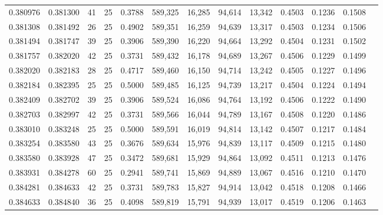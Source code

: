 \begin{tabular}{rrrrrrrrrrrrr}
0.380976 & 0.381300 &    41 &  25 &                                     0.3788 & 589,325 &  16,285 &  94,614 &  13,342 & 0.4503 & 0.1236 & 0.1508 \\
0.381308 & 0.381492 &    26 &  25 &                                     0.4902 & 589,351 &  16,259 &  94,639 &  13,317 & 0.4503 & 0.1234 & 0.1506 \\
0.381494 & 0.381747 &    39 &  25 &                                     0.3906 & 589,390 &  16,220 &  94,664 &  13,292 & 0.4504 & 0.1231 & 0.1502 \\
0.381757 & 0.382020 &    42 &  25 &                                     0.3731 & 589,432 &  16,178 &  94,689 &  13,267 & 0.4506 & 0.1229 & 0.1499 \\
0.382020 & 0.382183 &    28 &  25 &                                     0.4717 & 589,460 &  16,150 &  94,714 &  13,242 & 0.4505 & 0.1227 & 0.1496 \\
0.382184 & 0.382395 &    25 &  25 &                                     0.5000 & 589,485 &  16,125 &  94,739 &  13,217 & 0.4504 & 0.1224 & 0.1494 \\
0.382409 & 0.382702 &    39 &  25 &                                     0.3906 & 589,524 &  16,086 &  94,764 &  13,192 & 0.4506 & 0.1222 & 0.1490 \\
0.382703 & 0.382997 &    42 &  25 &                                     0.3731 & 589,566 &  16,044 &  94,789 &  13,167 & 0.4508 & 0.1220 & 0.1486 \\
0.383010 & 0.383248 &    25 &  25 &                                     0.5000 & 589,591 &  16,019 &  94,814 &  13,142 & 0.4507 & 0.1217 & 0.1484 \\
0.383254 & 0.383580 &    43 &  25 &                                     0.3676 & 589,634 &  15,976 &  94,839 &  13,117 & 0.4509 & 0.1215 & 0.1480 \\
0.383580 & 0.383928 &    47 &  25 &                                     0.3472 & 589,681 &  15,929 &  94,864 &  13,092 & 0.4511 & 0.1213 & 0.1476 \\
0.383931 & 0.384278 &    60 &  25 &                                     0.2941 & 589,741 &  15,869 &  94,889 &  13,067 & 0.4516 & 0.1210 & 0.1470 \\
0.384281 & 0.384633 &    42 &  25 &                                     0.3731 & 589,783 &  15,827 &  94,914 &  13,042 & 0.4518 & 0.1208 & 0.1466 \\
0.384633 & 0.384840 &    36 &  25 &                                     0.4098 & 589,819 &  15,791 &  94,939 &  13,017 & 0.4519 & 0.1206 & 0.1463 \\

\end{tabular}
